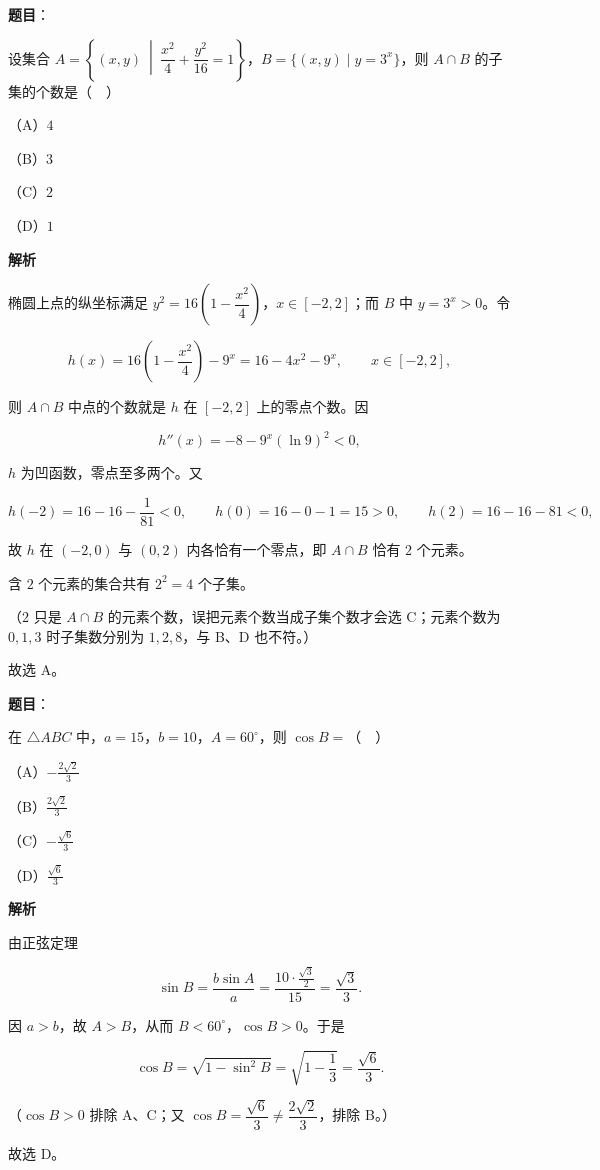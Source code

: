 \begin{answer}

\textbf{题目}：

设集合 $A=\left\{(x,y)\ \middle|\ \dfrac{x^2}{4}+\dfrac{y^2}{16}=1\right\}$，$B=\{(x,y)\mid y=3^x\}$，则 $A\cap B$ 的子集的个数是（　）

（A）$4$

（B）$3$

（C）$2$

（D）$1$

\textbf{解析}

椭圆上点的纵坐标满足 $y^2=16\left(1-\dfrac{x^2}{4}\right)$，$x\in[-2,2]$；而 $B$ 中 $y=3^x>0$。令

\nopagebreak[4]
\[h(x)=16\left(1-\frac{x^2}{4}\right)-9^x=16-4x^2-9^x,\qquad x\in[-2,2],\]

则 $A\cap B$ 中点的个数就是 $h$ 在 $[-2,2]$ 上的零点个数。因

\nopagebreak[4]
\[h''(x)=-8-9^x(\ln9)^2<0,\]

$h$ 为凹函数，零点至多两个。又

\nopagebreak[4]
\[h(-2)=16-16-\frac1{81}<0,\qquad h(0)=16-0-1=15>0,\qquad h(2)=16-16-81<0,\]

故 $h$ 在 $(-2,0)$ 与 $(0,2)$ 内各恰有一个零点，即 $A\cap B$ 恰有 $2$ 个元素。

含 $2$ 个元素的集合共有 $2^2=4$ 个子集。

（$2$ 只是 $A\cap B$ 的元素个数，误把元素个数当成子集个数才会选 C；元素个数为 $0,1,3$ 时子集数分别为 $1,2,8$，与 B、D 也不符。）

故选 A。


\end{answer}
\begin{answer}

\textbf{题目}：

在 $\triangle ABC$ 中，$a=15$，$b=10$，$A=60^\circ$，则 $\cos B=$（　）

（A）$-\frac{2\sqrt2}{3}$

（B）$\frac{2\sqrt2}{3}$

（C）$-\frac{\sqrt6}{3}$

（D）$\frac{\sqrt6}{3}$

\textbf{解析}

由正弦定理

\nopagebreak[4]
\[\sin B=\frac{b\sin A}{a}=\frac{10\cdot\frac{\sqrt3}{2}}{15}=\frac{\sqrt3}{3}.\]

因 $a>b$，故 $A>B$，从而 $B<60^\circ$，$\cos B>0$。于是

\nopagebreak[4]
\[\cos B=\sqrt{1-\sin^2B}=\sqrt{1-\frac13}=\frac{\sqrt6}{3}.\]

（$\cos B>0$ 排除 A、C；又 $\cos B=\dfrac{\sqrt6}{3}\ne\dfrac{2\sqrt2}{3}$，排除 B。）

故选 D。


\end{answer}
